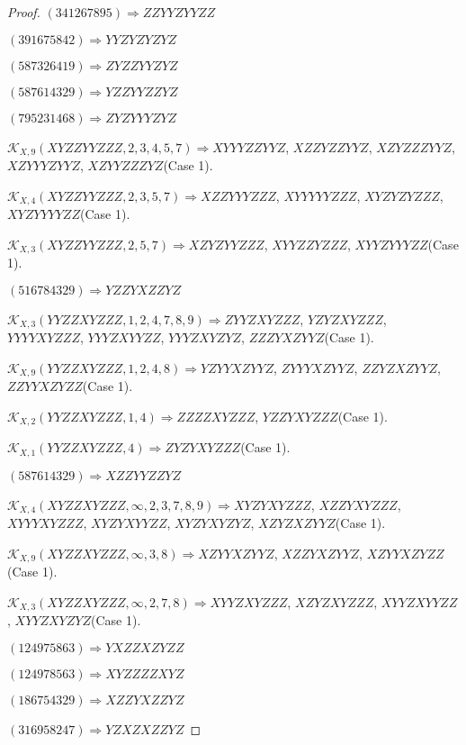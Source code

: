 \documentclass[12pt]{article}
\theoremstyle{plain}
\theoremstyle{definition}
\theoremstyle{remark}
\newcommand{\fancy}[1]{\mathcal{#1}}
\def\K{\fancy{K}}
\begin{document}
\begin{proof}
	$(3 4 1 2 6 7 8 9 5)\Rightarrow ZZYYZYYZZ$
	
	$(3 9 1 6 7 5 8 4 2)\Rightarrow YYZYZYZYZ$
	
	$(5 8 7 3 2 6 4 1 9)\Rightarrow ZYZZYYZYZ$
	
	$(5 8 7 6 1 4 3 2 9)\Rightarrow YZZYYZZYZ$
	
	$(7 9 5 2 3 1 4 6 8)\Rightarrow ZYZYYYZYZ$
	
	
	
	$\K_{X,9}(XYZZYYZZZ,2, 3, 4, 5, 7)\Rightarrow $$XYYYZZYYZ$, $XZZYZZYYZ$, $XZYZZZYYZ$, $XZYYYZYYZ$, $XZYYZZZYZ$(Case 1).
	
	$\K_{X,4}(XYZZYYZZZ,2, 3, 5, 7)\Rightarrow $$XZZYYYZZZ$, $XYYYYYZZZ$, $XYZYZYZZZ$, $XYZYYYYZZ$(Case 1).
	
	$\K_{X,3}(XYZZYYZZZ,2, 5, 7)\Rightarrow $$XZYZYYZZZ$, $XYYZZYZZZ$, $XYYZYYYZZ$(Case 1).
	
	
	
	$(5 1 6 7 8 4 3 2 9)\Rightarrow YZZYXZZYZ$
	
	
	
	$\K_{X,3}(YYZZXYZZZ,1, 2, 4, 7, 8, 9)\Rightarrow $$ZYYZXYZZZ$, $YZYZXYZZZ$, $YYYYXYZZZ$, $YYYZXYYZZ$, $YYYZXYZYZ$, $ZZZYXZYYZ$(Case 1).
	
	$\K_{X,9}(YYZZXYZZZ,1, 2, 4, 8)\Rightarrow $$YZYYXZYYZ$, $ZYYYXZYYZ$, $ZZYZXZYYZ$, $ZZYYXZYZZ$(Case 1).
	
	$\K_{X,2}(YYZZXYZZZ,1, 4)\Rightarrow $$ZZZZXYZZZ$, $YZZYXYZZZ$(Case 1).
	
	$\K_{X,1}(YYZZXYZZZ,4)\Rightarrow $$ZYZYXYZZZ$(Case 1).
	
	
	
	$(5 8 7 6 1 4 3 2 9)\Rightarrow XZZYYZZYZ$
	
	
	
	$\K_{X,4}(XYZZXYZZZ,\infty,2, 3, 7, 8, 9)\Rightarrow $$XYZYXYZZZ$, $XZZYXYZZZ$, $XYYYXYZZZ$, $XYZYXYYZZ$, $XYZYXYZYZ$, $XZYZXZYYZ$(Case 1).
	
	$\K_{X,9}(XYZZXYZZZ,\infty,3, 8)\Rightarrow $$XZYYXZYYZ$, $XZZYXZYYZ$, $XZYYXZYZZ$(Case 1).
	
	$\K_{X,3}(XYZZXYZZZ,\infty,2, 7, 8)\Rightarrow $$XYYZXYZZZ$, $XZYZXYZZZ$, $XYYZXYYZZ$, $XYYZXYZYZ$(Case 1).
	
	
	
	$(1 2 4 9 7 5 8 6 3)\Rightarrow YXZZXZYZZ$
	
	$(1 2 4 9 7 8 5 6 3)\Rightarrow XYZZZZXYZ$
	
	$(1 8 6 7 5 4 3 2 9)\Rightarrow XZZYXZZYZ$
	
	$(3 1 6 9 5 8 2 4 7)\Rightarrow YZXZXZZYZ$
	

\end{proof}
\end{document}
